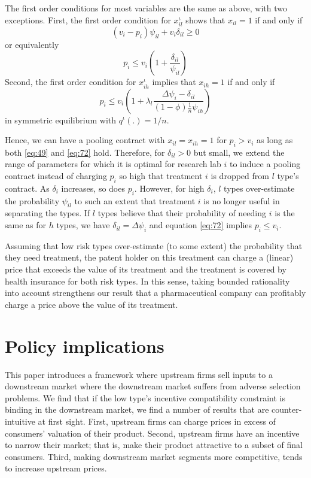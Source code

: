 \documentclass[a4paper,12pt]{article}
\begin{document}
The first order conditions for most variables are the same as above, with two exceptions. First, the first order condition for \(x_{il}^{\iota}\) shows that \(x_{il}=1\) if and only if
\begin{equation}
\label{eq:44}
(v_i-p_i)\psi_{il}+v_i \delta_{il} \geq 0
\end{equation}
or equivalently
\begin{equation}
\label{eq:49}
p_i \leq v_i \left(1+\frac{\delta_{il}}{\psi_{il}} \right)
\end{equation}
Second, the first order condition for \(x_{ih}^{\iota}\) implies that \(x_{ih}=1\) if and only if
\begin{equation}
\label{eq:72}
p_i \leq v_i \left(1+\lambda_l \frac{\Delta \psi_i -\delta_{il}}{(1-\phi)\frac{1}{n} \psi_{ih}} \right)
\end{equation}
in symmetric equilibrium with \(q^{\iota}(.)=1/n\).

Hence, we can have a pooling contract with \(x_{il}=x_{ih}=1\) for \(p_i>v_i\) as long as both \eqref{eq:49} and \eqref{eq:72} hold. Therefore, for \(\delta_{il} > 0\) but small, we extend the range of parameters for which it is optimal for research lab \(i\) to induce a pooling contract instead of charging \(p_i\) so high that treatment \(i\) is dropped from \(l\) type's contract. As \(\delta_i\) increases, so does \(p_i\). However, for high \(\delta_i\), \(l\) types over-estimate the probability \(\psi_{il}\) to such an extent that treatment \(i\) is no longer useful in separating the types. If \(l\) types believe that their probability of needing \(i\) is the same as for \(h\) types, we have \(\delta_{il} = \Delta \psi_i\) and equation \eqref{eq:72} implies \(p_i \leq v_i\).

Assuming that low risk types over-estimate (to some extent) the probability that they need treatment, the patent holder on this treatment can charge a (linear) price that exceeds the value of its treatment and the treatment is covered by health insurance for both risk types. In this sense, taking bounded rationality into account strengthens our result that a pharmaceutical company can profitably charge a price above the value of its treatment.

\section{Policy implications}
\label{sec:org3ad8fb3}

This paper introduces a framework where upstream firms sell inputs to a downstream market where the downstream market suffers from adverse selection problems. We find that if the low type's incentive compatibility constraint is binding in the downstream market, we find a number of results that are counter-intuitive at first sight. First, upstream firms can charge prices in excess of consumers' valuation of their product. Second, upstream firms have an incentive to narrow their market; that is, make their product attractive to a subset of final consumers. Third, making downstream market segments more competitive, tends to increase upstream prices.
\end{document}
